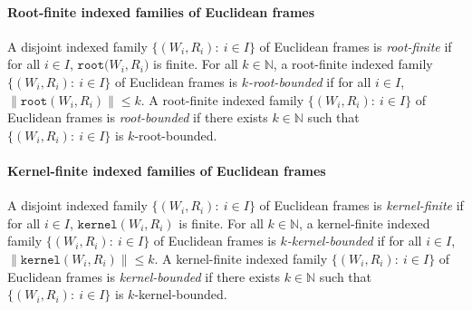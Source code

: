 \documentclass[draft]{article}
\def\N{\mathbb{N}}
\def\kernel{\mathtt{kernel}}
\def\root{\mathtt{root}}
\begin{document}
\paragraph{Root-finite indexed families of Euclidean frames}
%
%
A disjoint indexed family $\{(W_{i},R_{i}):\ i{\in}I\}$ of Euclidean frames is {\it root-finite}\/ if for all $i{\in}I$, $\root(W_{i},
%
%
%
%
%
%
%
%
%
%
%
%
$\linebreak$
%
%
%
%
%
%
%
%
%
%
%
%
R_{i})$ is finite.
For all $k{\in}\N$, a root-finite indexed family $\{(W_{i},R_{i}):\ i{\in}I\}$ of Euclidean frames is {\it $k$-root-bounded}\/ if for all $i{\in}I$, ${\parallel}\root(W_{i},R_{i}){\parallel}{\leq}k$.
A root-finite indexed family $\{(W_{i},R_{i}):\ i{\in}I\}$ of Euclidean frames is {\it root-bounded}\/ if there exists $k{\in}\N$ such that $\{(W_{i},R_{i}):\ i{\in}I\}$ is $k$-root-bounded.
%
%
%
%
\paragraph{Kernel-finite indexed families of Euclidean frames}
%
%
A disjoint indexed family $\{(W_{i},R_{i}):\ i{\in}I\}$ of Euclidean frames is {\it kernel-finite}\/ if for all $i{\in}I$, $\kernel(W_{i},R_{i})$ is finite.
For all $k{\in}\N$, a kernel-finite indexed family $\{(W_{i},R_{i}):\ i{\in}I\}$ of Euclidean frames is {\it $k$-kernel-bounded}\/ if for all $i{\in}I$, ${\parallel}\kernel(W_{i},R_{i}){\parallel}{\leq}k$.
A kernel-finite indexed family $\{(W_{i},R_{i}):\ i{\in}I\}$ of Euclidean frames is {\it kernel-bounded}\/ if there exists $k{\in}\N$ such that $\{(W_{i},R_{i}):\ i{\in}I\}$ is $k$-kernel-bounded.
%
%
%
%
%
%
%
%
%
%
\end{document}
